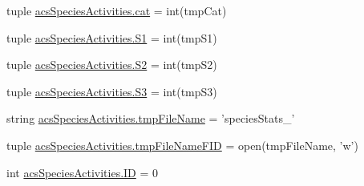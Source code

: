 \begin{DoxyCompactItemize}
tuple \hyperlink{a00129_a721a520fa04949579e29cb858dc00bf0}{acs\-Species\-Activities.\-cat} = int(tmp\-Cat)
\item 
tuple \hyperlink{a00129_a4ffac9566fa24baa2b27ccd97f9ffe1e}{acs\-Species\-Activities.\-S1} = int(tmp\-S1)
\item 
tuple \hyperlink{a00129_a3b95f66d848ccbac2740be2878b2499b}{acs\-Species\-Activities.\-S2} = int(tmp\-S2)
\item 
tuple \hyperlink{a00129_a654d2a657cf4b354b3791a8b2de3d74e}{acs\-Species\-Activities.\-S3} = int(tmp\-S3)
\item 
string \hyperlink{a00129_a23844a8104156ee329f8c957f11490f4}{acs\-Species\-Activities.\-tmp\-File\-Name} = 'species\-Stats\-\_\-'
\item 
tuple \hyperlink{a00129_addb867cf8533f2e18682c49f08f47bba}{acs\-Species\-Activities.\-tmp\-File\-Name\-F\-I\-D} = open(tmp\-File\-Name, 'w')
\item 
int \hyperlink{a00129_a8102909ea2c113190493bd581f17ba18}{acs\-Species\-Activities.\-I\-D} = 0
\end{DoxyCompactItemize}

